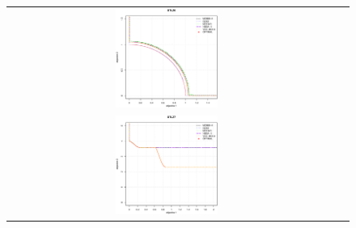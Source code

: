 \begin{figure}[h]
\begin{tabular}{ccc}
  \includegraphics[width=0.33\textwidth]{Figures_Chapter7/Results_Chapter3/DTLZ6.eps} \\
  \includegraphics[width=0.33\textwidth]{Figures_Chapter7/Results_Chapter3/DTLZ7.eps}
  \end{tabular}
\end{figure}
 
